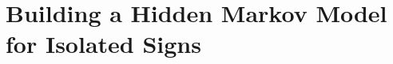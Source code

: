 \chapter{Building a Hidden Markov Model for Isolated Signs}
\ifpdf
    \graphicspath{{Chapter2/Chapter2Figs/PNG/}{Chapter2/Chapter2Figs/PDF/}{Chapter2/Chapter2Figs/}}
\else
    \graphicspath{{Chapter2/Chapter2Figs/EPS/}{Chapter2/Chapter2Figs/}}
\fi




